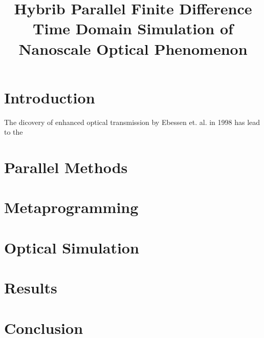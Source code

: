 \documentclass[11pt, conference, draftcls, letterpaper]{IEEEtran}
\begin{document}
\title{Hybrib Parallel Finite Difference Time Domain Simulation of
  Nanoscale Optical Phenomenon}
\author{ 
}

\maketitle

\begin{abstract}
  
\end{abstract}


\section{Introduction}
The dicovery of enhanced optical transmission by Ebessen
et. al. \cite{ebessen1998} in 1998 has lead to the 

\section{Parallel Methods}

\section{Metaprogramming}

\section{Optical Simulation}

\section{Results}

\section{Conclusion}




\end{document}
